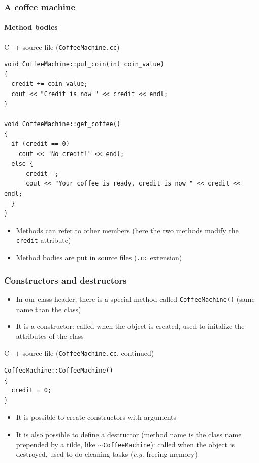 \documentclass{beamer}
\begin{document}
\begin{frame}[fragile]
  \frametitle{A coffee machine}
  \framesubtitle{Method bodies}
  \begin{block}{C++ source file (\texttt{CoffeeMachine.cc})}
    \begin{scriptsize}
\begin{verbatim}
void CoffeeMachine::put_coin(int coin_value)
{
  credit += coin_value;
  cout << "Credit is now " << credit << endl;
}

void CoffeeMachine::get_coffee()
{
  if (credit == 0)
    cout << "No credit!" << endl;
  else {
      credit--;
      cout << "Your coffee is ready, credit is now " << credit << endl;
  }
}
\end{verbatim}
    \end{scriptsize}
  \end{block}
  \begin{itemize}
  \item Methods can refer to other members (here the two methods modify the \texttt{credit} attribute)
  \item Method bodies are put in source files (\texttt{.cc} extension)
  \end{itemize}
\end{frame}

\begin{frame}[fragile]
  \frametitle{Constructors and destructors}
  \begin{itemize}
  \item In our class header, there is a special method called \texttt{CoffeeMachine()} (same name than the class)
  \item It is a \alert{constructor}: called when the object is created, used to initalize the attributes of the class
  \end{itemize}
  \begin{block}{C++ source file (\texttt{CoffeeMachine.cc}, continued)}
    \begin{scriptsize}
\begin{verbatim}
CoffeeMachine::CoffeeMachine()
{
  credit = 0;
}
\end{verbatim}
    \end{scriptsize}   
  \end{block}
  \begin{itemize}
  \item It is possible to create constructors with arguments
  \item It is also possible to define a \alert{destructor} (method name is the class name prepended by a tilde, like \texttt{$\sim$CoffeeMachine}): called when the object is destroyed, used to do cleaning tasks (\textit{e.g.} freeing memory)
  \end{itemize}
\end{frame}
\end{document}
